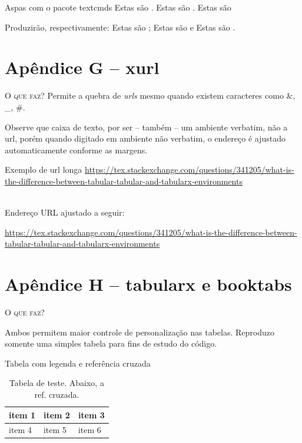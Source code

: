 \begin{codex}{Aspas com o pacote textcmds}
Estas são .
Estas são .
Estas são 
\end{codex}
 Produzirão, respectivamente: Estas são ; Estas são  e Estas são .


\chapter*{Apêndice G -- xurl}

\noindent\textsc{O que faz?}
Permite a quebra de \textit{urls} mesmo quando existem caracteres como \&, \_, \#.

Observe que  caixa de texto, por ser -- também -- um ambiente verbatim, não  a url, porém quando digitado em ambiente não verbatim, o endereço é ajustado automaticamente conforme as margens.

\begin{codex}{Exemplo de url longa}
  \url{https://tex.stackexchange.com/questions/341205/what-is-the-difference-between-tabular-tabular-and-tabularx-environments}
\end{codex}
\ \\
Endereço URL ajustado a seguir:

\url{https://tex.stackexchange.com/questions/341205/what-is-the-difference-between-tabular-tabular-and-tabularx-environments}

\chapter*{Apêndice H -- tabularx e booktabs}

\noindent\textsc{O que faz?}

Ambos permitem maior controle de personalização nas tabelas. Reproduzo somente uma simples tabela para fins de estudo do código.

\begin{codex}{Tabela com legenda e referência cruzada}
\begin{table}[h!]
    \begin{center}
	\begin{tabularx}{0.8\textwidth} { 
	| >{\centering\arraybackslash}X 
	| >{\centering\arraybackslash}X 
	| >{\centering\arraybackslash}X | }
	\hline
	item 1 & item 2 & item 3 \\
	\hline
	item 4  & item 5  & item 6  \\
	\hline
	\end{tabularx}
	\caption{Tabela de teste. Abaixo, a ref. cruzada.}
	\label{table:1}
	\end{center}
\end{table}
\end{codex}

